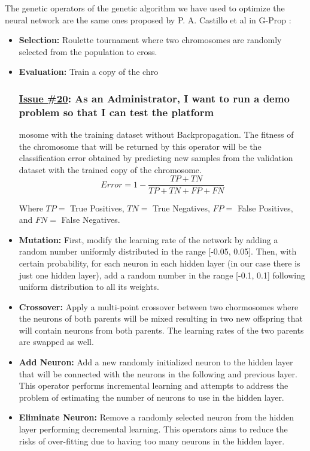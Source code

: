 The genetic operators of the genetic algorithm we have used  to optimize the neural network are the same ones proposed by P. A. Castillo et al in G-Prop \cite{gprop}:

\begin{itemize}
	\item \textbf{Selection:} Roulette tournament where two chromosomes are randomly selected from the population to cross.
	
	\item \textbf{Evaluation:} Train a copy of the chro\subsubsection*{\href{https://github.com/salvacorts/TFG-Parasitic-Metaheuristics/issues/20}{Issue \#20}: As an Administrator, I want to run a demo problem so that I can test the platform} mosome with the training dataset without Backpropagation. The fitness of the chromosome that will be returned by this operator will be the classification error obtained by predicting new samples from the validation dataset with the trained copy of the chromosome.
	$$ Error = 1 - \frac{TP + TN}{TP + TN + FP + FN}  $$
	
	Where $TP = $ True Positives, $TN = $ True Negatives, $FP = $ False Positives, and $FN = $ False Negatives.
	
	\item \textbf{Mutation:} First, modify the learning rate of the network by adding a random number uniformly distributed in the range [-0.05, 0.05]. Then, with certain probability, for each neuron in each hidden layer (in our case there is just one hidden layer), add a random number in the range [-0.1, 0.1] following uniform distribution to all its weights.
	
	\item \textbf{Crossover:} Apply a multi-point crossover between two chormosomes where the neurons of both parents will be mixed resulting in two new offspring that will contain neurons from both parents. The learning rates of the two parents are swapped as well.
	
	\item \textbf{Add Neuron:} Add a new randomly initialized neuron to the hidden layer that will be connected with the neurons in the following and previous layer. This operator performs incremental learning and attempts to address the problem of estimating the number of neurons to use in the hidden layer.
	
	\item \textbf{Eliminate Neuron:} Remove a randomly selected neuron from the hidden layer performing decremental learning. This operators aims to reduce the risks of over-fitting due to having too many neurons in the hidden layer.
	

\end{itemize}
